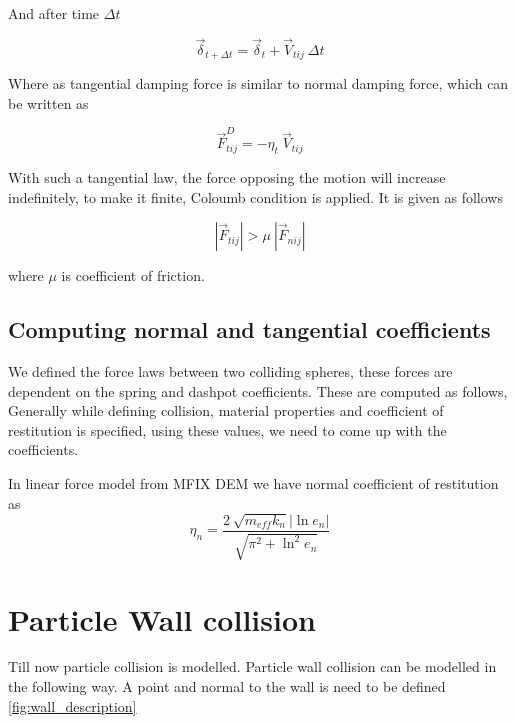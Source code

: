 And after time $\Delta t$

\begin{equation}
  \label{eq:tang_disp}
 \vec{\delta}_{t + \Delta t} = \vec{\delta}_{t} + \vec{V}_{tij} \> \Delta t
\end{equation}

Where as tangential damping force is similar to normal damping force, which can be
written as

\begin{equation}
  \label{eq:tang_damp_force}
  \vec{F}_{tij}^D = -\eta_t \> \vec{V}_{tij}
\end{equation}

With such a tangential law, the force opposing the motion will increase indefinitely,
to make it finite, Coloumb condition is applied. It is given as follows

\begin{equation}
  \label{eq:coloumb}
  |\vec{F}_{tij}| > \mu \> |\vec{F}_{nij}|
\end{equation}

where $\mu$ is coefficient of friction.

\subsection{Computing normal and tangential coefficients}

We defined the force laws between two colliding spheres, these forces are
dependent on the spring and dashpot coefficients. These are computed as follows,
Generally while defining collision, material properties and coefficient of restitution is
specified, using these values, we need to come up with the coefficients.

In linear force model from MFIX DEM we have normal coefficient of restitution as
\begin{equation}
  \label{eq:damping_coefficient}
  \eta_{n} = \frac{2 \> \sqrt{m_{eff}k_{n}}|\ln e_n|}{\sqrt{\pi^2 + \ln^2e_{n}}}
\end{equation}


\section{Particle Wall collision}
\label{sec:PWColl}

Till now particle  collision is modelled. Particle wall
collision can be modelled in the following way. A point and normal to
the wall is need to be defined \ref{fig:wall_description}

